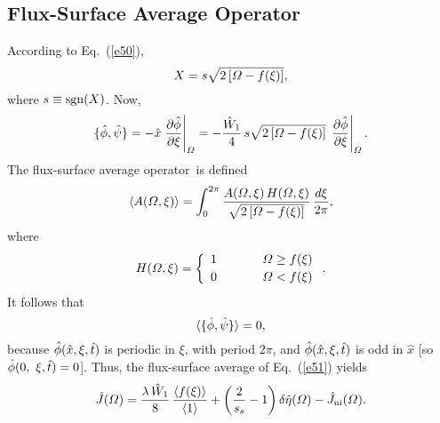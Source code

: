 \documentclass[12pt,prb,aps]{revtex4-1}
\begin{document}
\subsection{Flux-Surface Average Operator}
According to Eq.~(\ref{e50}), 
\begin{equation}
X = s\sqrt{2\left[{\mit\Omega}-f(\xi)\right]},
\end{equation}
where $s\equiv {\rm sgn}(X)$. Now,
\begin{equation}
 \{\skew{3}\hat{\phi},\hat{\psi}\} = -\hat{x}\left.\frac{\partial\hat{\phi}}{\partial\xi}\right|_{\mit\Omega}= -\frac{\hat{W}_1}{4}\,
 s\sqrt{2\left[{\mit\Omega}-f(\xi)\right]}\,\left.\frac{\partial\hat{\phi}}{\partial\xi}\right|_{\mit\Omega}.
 \end{equation}
 The  flux-surface average operator\,\cite{ruth} is defined
 \begin{equation}\label{e54}
 \langle A({\mit\Omega},\xi)\rangle= \int_{0}^{2\pi}\frac{A({\mit\Omega},\xi)\,H({\mit\Omega},\xi)}
 {\sqrt{2\left[{\mit\Omega}-f(\xi)\right]}}\,\frac{d\xi}{2\pi},
 \end{equation}
 where
 \begin{equation}\label{e55}
 H({\mit\Omega},\xi) = \left\{
 \begin{array}{ccc} 1&~~~~~&{\mit\Omega}\geq f(\xi)\\[0.5ex]
 0 &&{\mit\Omega}< f(\xi)\end{array}\right..
 \end{equation}
 It follows that
 \begin{equation}
 \langle \{\skew{3}\hat{\phi},\hat{\psi}\}\rangle = 0,
 \end{equation}
 because $\skew{3}\hat{\phi}(\hat{x},\xi,\hat{t})$ is periodic in $\xi$, with period $2\pi$, and $\skew{3}\hat{\phi}(\hat{x},\xi,\hat{t})$
 is odd in $\hat{x}$ [so $\skew{3}\hat{\phi}(0,\
 \xi,\hat{t})=0$]. Thus, the flux-surface average of Eq.~(\ref{e51}) yields
 \begin{equation}\label{e57}
 \hat{J}({\mit\Omega}) = \frac{\lambda\,\hat{W}_1}{8}\,\frac{\langle f(\xi)\rangle}{\langle 1\rangle} +\left(\frac{2}{s_s}-1\right)\delta\hat{\eta}({\mit\Omega}) - \hat{J}_{\rm ni}({\mit\Omega}).
 \end{equation}
\end{document}
